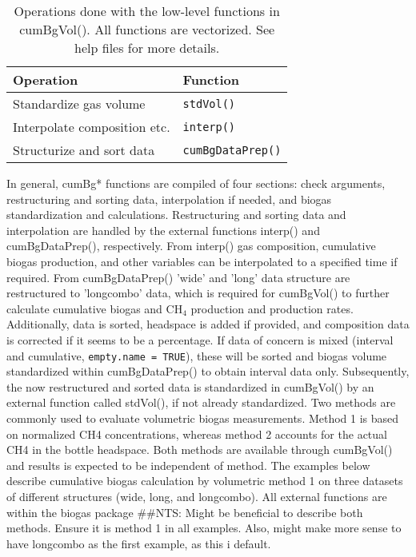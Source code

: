 \documentclass{article}
\begin{document}
\begin{table}[h!]
  \begin{center}
  \caption{Operations done with the low-level functions in cumBgVol(). All functions are vectorized. See help files for more details.}
  \label{tab:lowfunctionsummary}
  \vspace{3pt}
  
  \begin{tabular}{ll}
    \hline
    Operation                                    &   Function \\
    \hline
    Standardize gas volume                       &   \texttt{stdVol()} \\
    Interpolate composition etc.                 &   \texttt{interp()} \\
    Structurize and sort data                    &   \texttt{cumBgDataPrep()} \\   
		\hline
  \end{tabular}
  \end{center}
\end{table}

In general, cumBg* functions are compiled of four sections: check arguments, restructuring and sorting data, interpolation if needed, and biogas standardization and calculations. Restructuring and sorting data and interpolation are handled by the external functions interp() and cumBgDataPrep(), respectively. From interp() gas composition, cumulative biogas production, and other variables can be interpolated to a specified time if required. From cumBgDataPrep() 'wide' and 'long' data structure are restructured to 'longcombo' data, which is required for cumBgVol() to further calculate cumulative biogas and CH$_4$ production and production rates. Additionally, data is sorted, headspace is added if provided, and composition data is corrected if it seems to be a percentage. If data of concern is mixed (interval and cumulative, \texttt{empty.name = TRUE}), these will be sorted and biogas volume standardized within cumBgDataPrep() to obtain interval data only. Subsequently, the now restructured and sorted data is standardized in cumBgVol() by an external function called stdVol(), if not already standardized. 
Two methods are commonly used to evaluate volumetric biogas measurements. Method 1 is based on normalized CH4 concentrations, whereas method 2 accounts for the actual CH4 in the bottle headspace. Both methods are available through cumBgVol() and results is expected to be independent of method. The examples below describe cumulative biogas calculation by volumetric method 1 on three datasets of different structures (wide, long, and longcombo). 
All external functions are within the biogas package
##NTS: Might be beneficial to describe both methods. Ensure it is method 1 in all examples. Also, might make more sense to have longcombo as the first example, as this i default.
\end{document}
